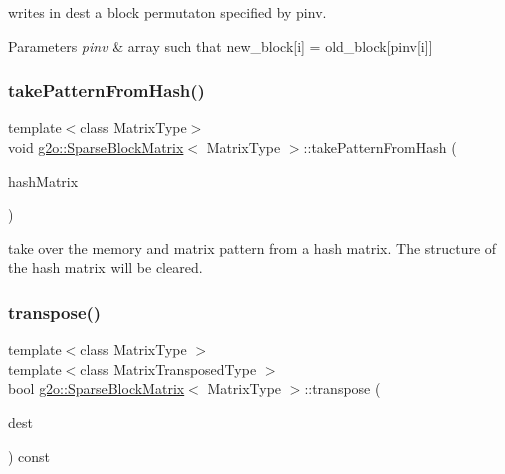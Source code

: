 writes in dest a block permutaton specified by pinv. 
\begin{DoxyParams}{Parameters}
{\em pinv} & array such that new\+\_\+block\mbox{[}i\mbox{]} = old\+\_\+block\mbox{[}pinv\mbox{[}i\mbox{]}\mbox{]} \\
\hline
\end{DoxyParams}
\mbox{\label{classg2o_1_1_sparse_block_matrix_a0b1e9dc3a24b0ab41d7002396a61c833}} 
\subsubsection{\texorpdfstring{take\+Pattern\+From\+Hash()}{takePatternFromHash()}}
{\footnotesize\ttfamily template$<$class Matrix\+Type$>$ \\
void \mbox{\hyperlink{classg2o_1_1_sparse_block_matrix}{g2o\+::\+Sparse\+Block\+Matrix}}$<$ Matrix\+Type $>$\+::take\+Pattern\+From\+Hash (\begin{DoxyParamCaption}\item[{\mbox{\hyperlink{classg2o_1_1_sparse_block_matrix_hash_map}{Sparse\+Block\+Matrix\+Hash\+Map}}$<$ Matrix\+Type $>$ \&}]{hash\+Matrix }\end{DoxyParamCaption})}

take over the memory and matrix pattern from a hash matrix. The structure of the hash matrix will be cleared. \mbox{\label{classg2o_1_1_sparse_block_matrix_a2d449bb4054991867a9b50b6c0d978eb}} 
\subsubsection{\texorpdfstring{transpose()}{transpose()}}
{\footnotesize\ttfamily template$<$class Matrix\+Type $>$ \\
template$<$class Matrix\+Transposed\+Type $>$ \\
bool \mbox{\hyperlink{classg2o_1_1_sparse_block_matrix}{g2o\+::\+Sparse\+Block\+Matrix}}$<$ Matrix\+Type $>$\+::transpose (\begin{DoxyParamCaption}\item[{\mbox{\hyperlink{classg2o_1_1_sparse_block_matrix}{Sparse\+Block\+Matrix}}$<$ Matrix\+Transposed\+Type $>$ $\ast$\&}]{dest }\end{DoxyParamCaption}) const}



